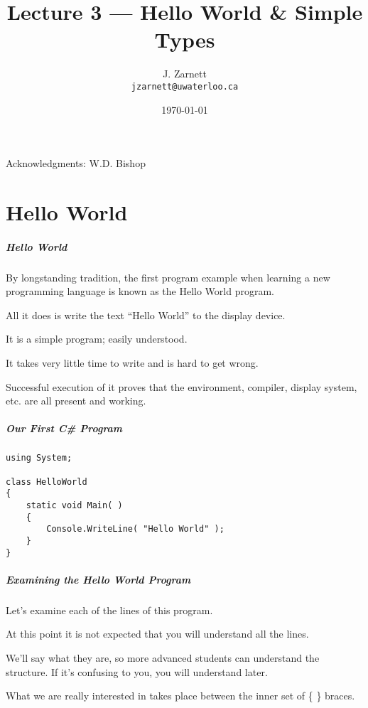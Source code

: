 

\title{Lecture 3 --- Hello World \& Simple Types }

\author{J. Zarnett\\
\texttt{jzarnett@uwaterloo.ca}}
\date{\today}



\begin{frame}
  \titlepage
  
  \begin{center}
  \small{Acknowledgments: W.D. Bishop}
  \end{center}
 \end{frame}
 

\part{Hello World}
\begin{frame}\partpage\end{frame}

\begin{frame}
\frametitle{Hello World}

By longstanding tradition, the first program example when learning a new programming language is known as the \alert{Hello World} program.

All it does is write the text ``Hello World'' to the display device.

It is a simple program; easily understood.

It takes very little time to write and is hard to get wrong.

Successful execution of it proves that the environment, compiler, display system, etc. are all present and working.

\end{frame}

\begin{frame}[fragile]
\frametitle{Our First C\# Program}

\begin{verbatim}
using System;

class HelloWorld
{
    static void Main( )
    {
        Console.WriteLine( "Hello World" );
    }
}
\end{verbatim}

\end{frame}

\begin{frame}
\frametitle{Examining the Hello World Program}
Let's examine each of the lines of this program.

At this point it is not expected that you will understand all the lines.

We'll say what they are, so more advanced students can understand the structure. If it's confusing to you, you will understand later.

What we are really interested in takes place between the inner set of \{ \} braces.

\end{frame}

